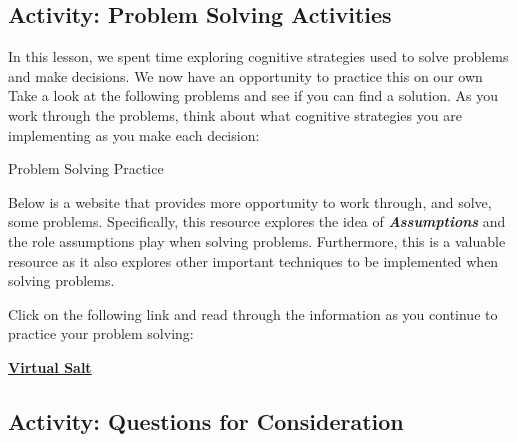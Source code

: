 \documentclass[
]{book}
\begin{document}
\hypertarget{activity-problem-solving-activities}{%
\subsection*{Activity: Problem Solving Activities}\label{activity-problem-solving-activities}}

\begin{reflect}
In this lesson, we spent time exploring cognitive strategies used to solve problems and make decisions. We now have an opportunity to practice this on our own Take a look at the following problems and see if you can find a solution. As you work through the problems, think about what cognitive strategies you are implementing as you make each decision:

{Problem Solving Practice}

Below is a website that provides more opportunity to work through, and solve, some problems. Specifically, this resource explores the idea of \textbf{\emph{Assumptions}} and the role assumptions play when solving problems. Furthermore, this is a valuable resource as it also explores other important techniques to be implemented when solving problems.

Click on the following link and read through the information as you continue to practice your problem solving:

\href{https://www.virtualsalt.com/crebook4.htm}{\textbf{Virtual Salt}}
\end{reflect}

\hypertarget{activity-questions-for-consideration}{%
\subsection*{Activity: Questions for Consideration}\label{activity-questions-for-consideration}}
\end{document}
